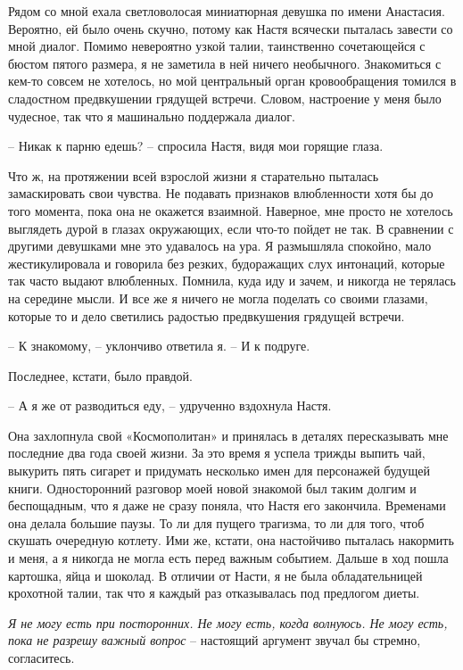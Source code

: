 \documentclass[
]{book}
\begin{document}
Рядом со мной ехала светловолосая миниатюрная девушка по имени Анастасия. Вероятно, ей было очень скучно, потому как Настя всячески пыталась завести со мной диалог. Помимо невероятно узкой талии, таинственно сочетающейся с бюстом пятого размера, я не заметила в ней ничего необычного. Знакомиться с кем-то совсем не хотелось, но мой центральный орган кровообращения томился в сладостном предвкушении грядущей встречи. Словом, настроение у меня было чудесное, так что я машинально поддержала диалог.

-- Никак к парню едешь? -- спросила Настя, видя мои горящие глаза.

Что ж, на протяжении всей взрослой жизни я старательно пыталась замаскировать свои чувства. Не подавать признаков влюбленности хотя бы до того момента, пока она не окажется взаимной. Наверное, мне просто не хотелось выглядеть дурой в глазах окружающих, если что-то пойдет не так. В сравнении с другими девушками мне это удавалось на ура. Я размышляла спокойно, мало жестикулировала и говорила без резких, будоражащих слух интонаций, которые так часто выдают влюбленных. Помнила, куда иду и зачем, и никогда не терялась на середине мысли. И все же я ничего не могла поделать со своими глазами, которые то и дело светились радостью предвкушения грядущей встречи.

-- К знакомому, -- уклончиво ответила я. -- И к подруге.

Последнее, кстати, было правдой.

-- А я же от разводиться еду, -- удрученно вздохнула Настя.

Она захлопнула свой «Космополитан» и принялась в деталях пересказывать мне последние два года своей жизни. За это время я успела трижды выпить чай, выкурить пять сигарет и придумать несколько имен для персонажей будущей книги. Односторонний разговор моей новой знакомой был таким долгим и беспощадным, что я даже не сразу поняла, что Настя его закончила. Временами она делала большие паузы. То ли для пущего трагизма, то ли для того, чтоб скушать очередную котлету. Ими же, кстати, она настойчиво пыталась накормить и меня, а я никогда не могла есть перед важным событием. Дальше в ход пошла картошка, яйца и шоколад. В отличии от Насти, я не была обладательницей крохотной талии, так что я каждый раз отказывалась под предлогом диеты.

\emph{Я не могу есть при посторонних. Не могу есть, когда волнуюсь. Не могу есть, пока не разрешу важный вопрос} -- настоящий аргумент звучал бы стремно, согласитесь.
\end{document}

